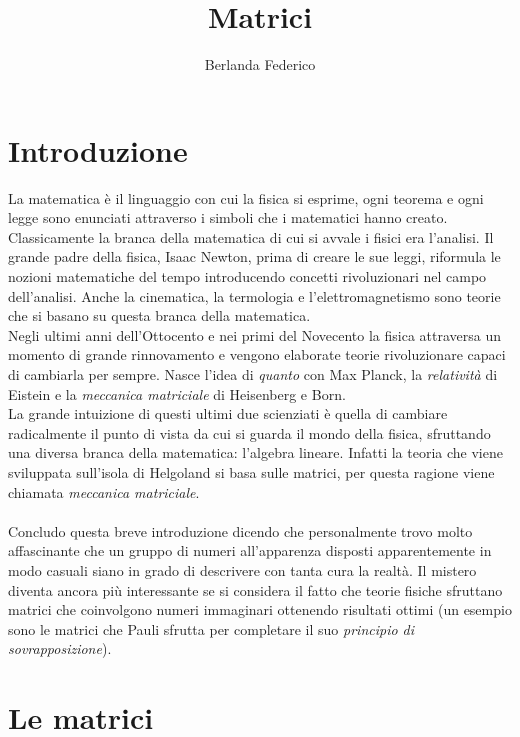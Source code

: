 \documentclass[a4paper]{article}
\title{Matrici}
\author{Berlanda Federico}
\begin{document}
\maketitle

\section{Introduzione}

La matematica è il linguaggio con cui la fisica si esprime, ogni teorema e ogni legge sono enunciati attraverso i simboli che i matematici hanno creato.
\\Classicamente la branca della matematica di cui si avvale i fisici era l’analisi. Il grande padre della fisica, Isaac Newton, prima di creare le sue leggi, riformula le nozioni matematiche del tempo introducendo concetti rivoluzionari nel campo dell’analisi. Anche la cinematica, la termologia e l’elettromagnetismo sono teorie che si basano su questa branca della matematica.
\\Negli ultimi anni dell’Ottocento e nei primi del Novecento la fisica attraversa un momento di grande rinnovamento e vengono elaborate teorie rivoluzionare capaci di cambiarla per sempre. Nasce l’idea di \textit{quanto} con Max Planck, la \textit{relatività} di Eistein e la \textit{meccanica matriciale} di Heisenberg e Born.
\\La grande intuizione di questi ultimi due scienziati è quella di cambiare radicalmente il punto di vista da cui si guarda il mondo della fisica, sfruttando una diversa branca della matematica: l'algebra lineare. Infatti la teoria che viene sviluppata sull’isola di Helgoland si basa sulle matrici, per questa ragione viene chiamata \textit{meccanica matriciale}.
\\
\\Concludo questa breve introduzione dicendo che personalmente trovo molto affascinante che un gruppo di numeri all'apparenza disposti apparentemente in modo casuali siano in grado di descrivere con tanta cura la realtà. Il mistero diventa ancora più interessante se si considera il fatto che teorie fisiche sfruttano matrici che coinvolgono numeri immaginari ottenendo risultati ottimi (un esempio sono le matrici che Pauli sfrutta per completare il suo \textit{principio di sovrapposizione}).

\section{Le matrici}
\end{document}
